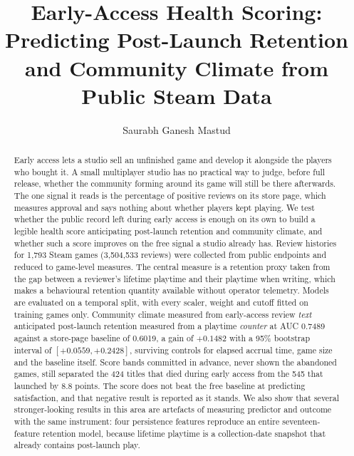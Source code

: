 \documentclass[sigconf]{acmart}
\begin{document}
\title{Early-Access Health Scoring: Predicting Post-Launch Retention and
Community Climate from Public Steam Data}

\author{Saurabh Ganesh Mastud}

\renewcommand{\shortauthors}{Mastud}

\begin{abstract}
Early access lets a studio sell an unfinished game and develop it alongside the players who bought
it. A small multiplayer studio has no practical way to judge, before full release, whether the
community forming around its game will still be there afterwards. The one signal it reads is the
percentage of positive reviews on its store page, which measures approval and says nothing about
whether players kept playing. We test whether the public record left during early access is enough
on its own to build a legible health score anticipating post-launch retention and community
climate, and whether such a score improves on the free signal a studio already has. Review
histories for 1,793 Steam games (3,504,533 reviews) were collected from public endpoints and
reduced to game-level measures. The central measure is a retention proxy taken from the gap between
a reviewer's lifetime playtime and their playtime when writing, which makes a behavioural retention
quantity available without operator telemetry. Models are evaluated on a temporal split, with every
scaler, weight and cutoff fitted on training games only. Community climate measured from
early-access review \emph{text} anticipated post-launch retention measured from a playtime
\emph{counter} at AUC 0.7489 against a store-page baseline of 0.6019, a gain of $+0.1482$ with a
95\% bootstrap interval of $[+0.0559, +0.2428]$, surviving controls for elapsed accrual time, game
size and the baseline itself. Score bands committed in advance, never shown the abandoned games,
still separated the 424 titles that died during early access from the 545 that launched by 8.8
points. The score does not beat the free baseline at predicting satisfaction, and that negative
result is reported as it stands. We also show that several stronger-looking results in this area
are artefacts of measuring predictor and outcome with the same instrument: four persistence
features reproduce an entire seventeen-feature retention model, because lifetime playtime is a
collection-date snapshot that already contains post-launch play.
\end{abstract}
\end{document}
